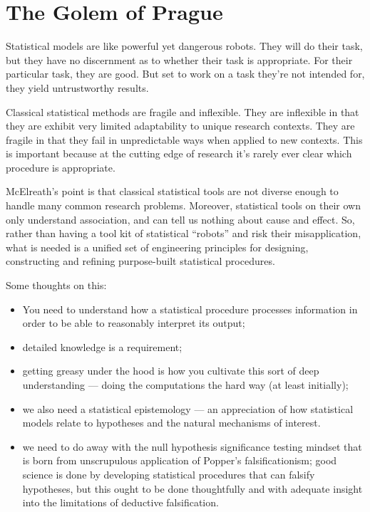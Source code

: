 \documentclass[
]{book}
\providecommand{\tightlist}{%
  \setlength{\itemsep}{0pt}\setlength{\parskip}{0pt}}
\begin{document}
\hypertarget{theGolemOfPrague}{%
\chapter{The Golem of Prague}\label{theGolemOfPrague}}

Statistical models are like powerful yet dangerous robots. They will do their task, but they have no discernment as to whether their task is appropriate. For their particular task, they are good. But set to work on a task they're not intended for, they yield untrustworthy results.

Classical statistical methods are fragile and inflexible. They are inflexible in that they are exhibit very limited adaptability to unique research contexts. They are fragile in that they fail in unpredictable ways when applied to new contexts. This is important because at the cutting edge of research it's rarely ever clear which procedure is appropriate.

McElreath's point is that classical statistical tools are not diverse enough to handle many common research problems. Moreover, statistical tools on their own only understand association, and can tell us nothing about cause and effect. So, rather than having a tool kit of statistical ``robots'' and risk their misapplication, what is needed is a unified set of engineering principles for designing, constructing and refining purpose-built statistical procedures.

Some thoughts on this:

\begin{itemize}
\tightlist
\item
  You need to understand how a statistical procedure processes information in order to be able to reasonably interpret its output;
\item
  detailed knowledge is a requirement;
\item
  getting greasy under the hood is how you cultivate this sort of deep understanding --- doing the computations the hard way (at least initially);
\item
  we also need a statistical epistemology --- an appreciation of how statistical models relate to hypotheses and the natural mechanisms of interest.
\item
  we need to do away with the null hypothesis significance testing mindset that is born from unscrupulous application of Popper's falsificationism; good science is done by developing statistical procedures that can falsify hypotheses, but this ought to be done thoughtfully and with adequate insight into the limitations of deductive falsification.
\end{itemize}
\end{document}

